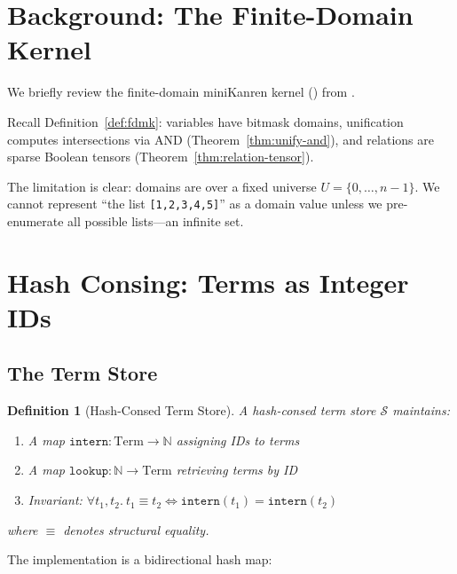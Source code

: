 \documentclass[11pt,a4paper]{article}
\newtheorem{definition}[theorem]{Definition}
\begin{document}
\section{Background: The Finite-Domain Kernel}
\label{sec:background_chirho}

We briefly review the finite-domain miniKanren kernel (\fdmk) from \paperA.

Recall Definition~\ref{def:fdmk}: variables have bitmask domains, unification
computes intersections via AND (Theorem~\ref{thm:unify-and}), and relations
are sparse Boolean tensors (Theorem~\ref{thm:relation-tensor}).

The limitation is clear: domains are over a fixed universe $U = \{0, \ldots, n-1\}$.
We cannot represent ``the list \texttt{[1,2,3,4,5]}'' as a domain value unless
we pre-enumerate all possible lists---an infinite set.

\section{Hash Consing: Terms as Integer IDs}
\label{sec:hashcons_chirho}

\subsection{The Term Store}

\begin{definition}[Hash-Consed Term Store]
\label{def:term_store_chirho}
A \emph{hash-consed term store} $\mathcal{S}$ maintains:
\begin{enumerate}
  \item A map $\texttt{intern}: \text{Term} \to \mathbb{N}$ assigning IDs to terms
  \item A map $\texttt{lookup}: \mathbb{N} \to \text{Term}$ retrieving terms by ID
  \item Invariant: $\forall t_1, t_2.\ t_1 \equiv t_2 \Leftrightarrow \texttt{intern}(t_1) = \texttt{intern}(t_2)$
\end{enumerate}
where $\equiv$ denotes structural equality.
\end{definition}

The implementation is a bidirectional hash map:
\end{document}
